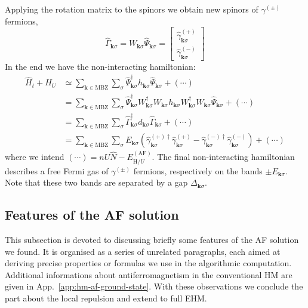 Applying the rotation matrix to the spinors we obtain new spinors of $\gamma^{(\pm)}$ fermions,
\begin{equation}\label{eq:af-Gamma=WPsi}
	\hat\Gamma_{\mathbf{k}\sigma} = W_{\mathbf{k}\sigma} \hat \Psi_{\mathbf{k}\sigma} = \begin{bmatrix}
		\hat \gamma_{\mathbf{k}\sigma}^{(+)} \\ \hat \gamma_{\mathbf{k}\sigma}^{(-)}
	\end{bmatrix}
\end{equation}
In the end we have the non-interacting hamiltonian:
\[
\begin{aligned}
	\hat H_t + \hat H_U &\simeq \sum_{\mathbf{k} \in \mathrm{MBZ}} \sum_\sigma \hat \Psi_{\mathbf{k}\sigma}^\dagger h_{\mathbf{k}\sigma} \hat \Psi_{\mathbf{k}\sigma} + (\cdots) \\
	&= \sum_{\mathbf{k} \in \mathrm{MBZ}} \sum_\sigma \hat \Psi_{\mathbf{k}\sigma}^\dagger W_{\mathbf{k}\sigma}^\dagger W_{\mathbf{k}\sigma} h_{\mathbf{k}\sigma} W_{\mathbf{k}\sigma}^\dagger W_{\mathbf{k}\sigma} \hat \Psi_{\mathbf{k}\sigma} + (\cdots) \\
	&= \sum_{\mathbf{k} \in \mathrm{MBZ}} \sum_\sigma \hat \Gamma_{\mathbf{k}\sigma}^\dagger d_{\mathbf{k}\sigma} \hat \Gamma_{\mathbf{k}\sigma} + (\cdots) \\
	&= \sum_{\mathbf{k} \in \mathrm{MBZ}} \sum_\sigma E_{\mathbf{k}\sigma} \left(
	\hat \gamma_{\mathbf{k}\sigma}^{(+)\dagger} \hat \gamma_{\mathbf{k}\sigma}^{(+)} - \hat \gamma_{\mathbf{k}\sigma}^{(-)\dagger} \hat \gamma_{\mathbf{k}\sigma}^{(-)}
	\right) + (\cdots) 
\end{aligned}
\]
where we intend $(\cdots) = nU \hat N -  E_{\mathrm{H}/U}^{(\mathrm{AF})}$. The final non-interacting hamiltonian describes a free Fermi gas of $\gamma^{(\pm)}$ fermions, respectively on the bands $\pm E_{\mathbf{k}\sigma}$. Note that these two bands are separated by a gap $\Delta_{\mathbf{k}\sigma}$.

\subsection{Features of the AF solution}\label{subsec:af-features}

This subsection is devoted to discussing briefly some features of the AF solution we found. It is organised as a series of unrelated paragraphs, each aimed at deriving precise properties or formulas we use in the algorithmic computation. Additional informations about antiferromagnetism in the conventional HM are given in App.~\ref{app:hm-af-ground-state}. With these observations we conclude the part about the local repulsion and extend to full EHM.

